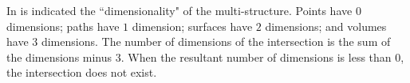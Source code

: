 \vspace{5mm}

In  is indicated the ``dimensionality" of the multi-structure. Points have \(0\) dimensions; paths have \(1\) dimension; surfaces have \(2\) dimensions; and volumes have \(3\) dimensions. The number of dimensions of the intersection is the sum of the dimensions minus \(3\). When the resultant number of dimensions is less than \(0\), the intersection does not exist.




